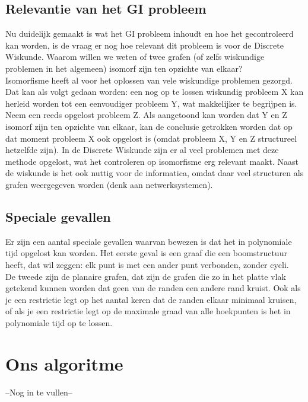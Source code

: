 \documentclass{article}
\begin{document}
\subsection{Relevantie van het GI probleem}
Nu duidelijk gemaakt is wat het GI probleem inhoudt en hoe het gecontroleerd kan worden, is de vraag er nog hoe relevant dit probleem is voor de Discrete Wiskunde. Waarom willen we weten of twee grafen (of zelfs wiskundige problemen in het algemeen) isomorf zijn ten opzichte van elkaar?\\

Isomorfisme heeft al voor het oplossen van vele wiskundige problemen gezorgd. Dat kan als volgt gedaan worden: een nog op te lossen wiskundig probleem X kan herleid worden tot een eenvoudiger probleem Y, wat makkelijker te begrijpen is. Neem een reeds opgelost probleem Z. Als aangetoond kan worden dat Y en Z isomorf zijn ten opzichte van elkaar, kan de conclusie getrokken worden dat op dat moment probleem X ook opgelost is (omdat probleem X, Y en Z structureel hetzelfde zijn). In de Discrete Wiskunde zijn er al veel problemen met deze methode opgelost, wat het controleren op isomorfisme erg relevant maakt.
Naast de wiskunde is het ook nuttig voor de informatica, omdat daar veel structuren als grafen weergegeven worden (denk aan netwerksystemen).

\subsection{Speciale gevallen}
Er zijn een aantal speciale gevallen waarvan bewezen is dat het in polynomiale tijd opgelost kan worden. Het eerste geval is een graaf die een boomstructuur heeft, dat wil zeggen: elk punt is met een ander punt verbonden, zonder cycli.\\
De tweede zijn de planaire grafen, dat zijn de grafen die zo in het platte vlak getekend kunnen worden dat geen van de randen een andere rand kruist. Ook als je een restrictie legt op het aantal keren dat de randen elkaar minimaal kruisen, of als je een restrictie legt op de maximale graad van alle hoekpunten is het in polynomiale tijd op te lossen.


\section{Ons algoritme}
--Nog in te vullen--
\end{document}
